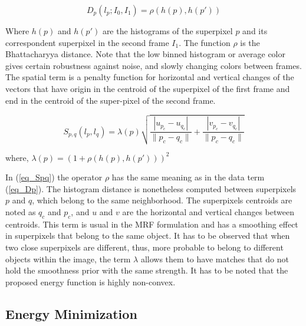 \begin{equation}
D_p(l_p;I_0,I_1) = \rho(h(p),h(p'))
\label{eq_Dp}
\end{equation}

Where $h(p)$ and $h(p')$ are the histograms of the superpixel $p$ and its correspondent superpixel in the
second frame $I_1$. The function $\rho$ is the Bhattacharyya distance. 
Note that the low binned histogram or average color gives certain robustness against noise,
and slowly changing colors between frames. The spatial term is a penalty function for horizontal
and vertical changes of the vectors that have origin in the centroid of the superpixel of the first frame and
end in the centroid of the super-pixel of the second frame.

\begin{equation}
S_{p,q}(l_p, l_q) = \lambda(p)
  \sqrt{\frac{|u_{p_c}-u_{q_c}|}{\|p_c-q_c\|}+ \frac{|v_{p_c}-v_{q_c}|}{\|p_c-q_c\|}}
\label{eq_Spq}
\end{equation}
\begin{center}
 where, $ \lambda(p) = (1 + \rho(h(p),h(p')))^2 $ \\
\end{center}

In (\ref{eq_Spq}) the operator $\rho$ has the same meaning as in the
data term (\ref{eq_Dp}). The histogram distance is nonetheless computed between superpixels $p$ and $q$, 
which belong to the same neighborhood. The superpixels centroids are noted as $q_c$ and $p_c$, 
and $u$ and $v$ are the horizontal and vertical changes between centroids.
This term is usual in the MRF formulation and has a smoothing effect in superpixels that belong to the
same object. It has to be observed that when two close superpixels are different, thus, more probable to
belong to different objects within the image, the term $\lambda$ allows them to have
matches that do not hold the smoothness prior with the same strength. 
It has to be noted that the proposed energy function is highly non-convex.

\subsection{Energy Minimization}

